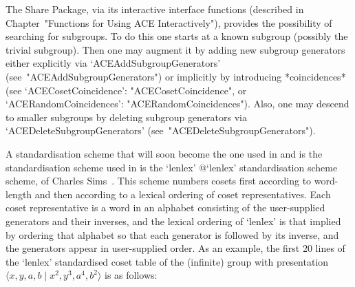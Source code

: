 
The  {\ACE}  Share  Package,  via  its  interactive  {\ACE}  interface
functions   (described   in   Chapter~"Functions   for    Using    ACE
Interactively"), provides the possibility of searching for  subgroups.
To do this one starts  at  a  known  subgroup  (possibly  the  trivial
subgroup). Then one may augment it by adding new  subgroup  generators
either        explicitly        via         `ACEAddSubgroupGenerators'
(see~"ACEAddSubgroupGenerators")   or   implicitly   by    introducing
*coincidences*     (see      `ACECosetCoincidence':
"ACECosetCoincidence",           or           `ACERandomCoincidences':
"ACERandomCoincidences"). Also, one may descend to  smaller  subgroups
by  deleting  subgroup  generators  via  `ACEDeleteSubgroupGenerators'
(see~"ACEDeleteSubgroupGenerators").


A standardisation scheme that will soon become the one used in  {\GAP}
and  is  the  standardisation   scheme   used   in   {\ACE}   is   the
`lenlex'{\undoquotes{} {@`lenlex'
standardisation scheme}} scheme, of Charles  Sims~\cite{Sims94}.  This
scheme  numbers  cosets  first  according  to  word-length  and   then
according to a lexical ordering of coset representatives.  Each  coset
representative  is  a  word  in  an   alphabet   consisting   of   the
user-supplied generators and their inverses, and the lexical  ordering
of `lenlex' is that implied by ordering that  alphabet  so  that  each
generator is followed by its inverse, and  the  generators  appear  in
user-supplied order. As an example, the first 20 lines of the `lenlex'
standardised coset table of the  (infinite)  group  with  presentation
$\langle x, y, a, b \mid x^2, y^3, a^4, b^2\rangle$ is as follows:

